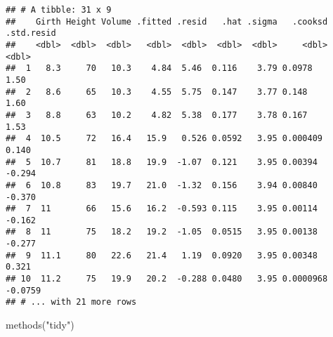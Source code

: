 \documentclass[
]{book}
\newenvironment{Shaded}{\begin{snugshade}}{\end{snugshade}}
\newcommand{\FunctionTok}[1]{\textcolor[rgb]{0.00,0.00,0.00}{#1}}
\newcommand{\NormalTok}[1]{#1}
\newcommand{\StringTok}[1]{\textcolor[rgb]{0.31,0.60,0.02}{#1}}
\begin{document}
\begin{verbatim}
## # A tibble: 31 x 9
##    Girth Height Volume .fitted .resid   .hat .sigma   .cooksd .std.resid
##    <dbl>  <dbl>  <dbl>   <dbl>  <dbl>  <dbl>  <dbl>     <dbl>      <dbl>
##  1   8.3     70   10.3    4.84  5.46  0.116    3.79 0.0978        1.50  
##  2   8.6     65   10.3    4.55  5.75  0.147    3.77 0.148         1.60  
##  3   8.8     63   10.2    4.82  5.38  0.177    3.78 0.167         1.53  
##  4  10.5     72   16.4   15.9   0.526 0.0592   3.95 0.000409      0.140 
##  5  10.7     81   18.8   19.9  -1.07  0.121    3.95 0.00394      -0.294 
##  6  10.8     83   19.7   21.0  -1.32  0.156    3.94 0.00840      -0.370 
##  7  11       66   15.6   16.2  -0.593 0.115    3.95 0.00114      -0.162 
##  8  11       75   18.2   19.2  -1.05  0.0515   3.95 0.00138      -0.277 
##  9  11.1     80   22.6   21.4   1.19  0.0920   3.95 0.00348       0.321 
## 10  11.2     75   19.9   20.2  -0.288 0.0480   3.95 0.0000968    -0.0759
## # ... with 21 more rows
\end{verbatim}

\begin{Shaded}
\begin{Highlighting}[]
\FunctionTok{methods}\NormalTok{(}\StringTok{"tidy"}\NormalTok{)}
\end{Highlighting}
\end{Shaded}
\end{document}
